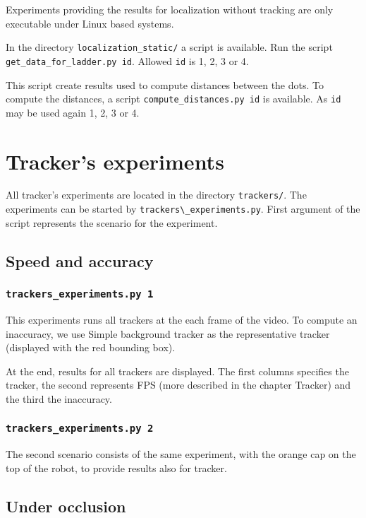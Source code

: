 Experiments providing the results for localization without tracking are only
executable under Linux based systems.

In the directory \verb+localization_static/+ a script is  available.
Run the script \verb+get_data_for_ladder.py id+. Allowed \verb+id+ is 1, 2, 3 or 4.

This script create results used to compute distances between the dots. To
compute the distances, a script \verb+compute_distances.py id+ is available. As
\verb+id+ may be used again 1, 2, 3 or 4. 

\section{Tracker's experiments}

All tracker's experiments are located in the directory \verb+trackers/+. The
experiments can be started by \verb+trackers\_experiments.py+. First argument
of the script represents the scenario for the experiment.

\subsection*{Speed and accuracy}

\subsubsection*{\texttt{trackers{\_}experiments.py 1}}

This experiments runs all trackers at the each frame of the video. To compute
an inaccuracy, we use Simple background tracker as the representative tracker
(displayed with the red bounding box).

At the end, results for all trackers are displayed. The first columns specifies
the tracker, the second represents FPS (more described in the chapter Tracker)
and the third the inaccuracy.

\subsubsection*{\texttt{trackers{\_}experiments.py 2}}

The second scenario consists of the same experiment, with the orange cap on the
top of the robot, to provide results also for \hsv{} tracker.

\subsection*{Under occlusion}

